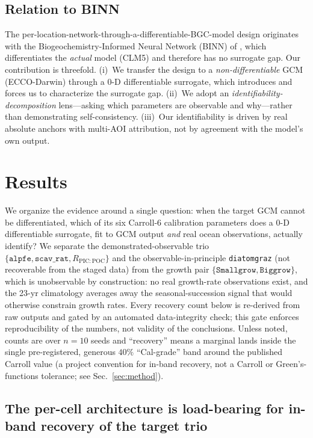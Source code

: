 \documentclass[11pt]{article}
\begin{document}
\subsection{Relation to BINN}

The per-location-network-through-a-differentiable-BGC-model design originates with the Biogeochemistry-Informed Neural Network (BINN) of \cite{xu2025binn}, which differentiates the \emph{actual} model (CLM5) and therefore has no surrogate gap. Our contribution is threefold. (i)~We transfer the design to a \emph{non-differentiable} GCM (ECCO-Darwin) through a $0$-D differentiable surrogate, which introduces and forces us to characterize the surrogate gap. (ii)~We adopt an \emph{identifiability-decomposition} lens---asking which parameters are observable and why---rather than demonstrating self-consistency. (iii)~Our identifiability is driven by real absolute anchors with multi-AOI attribution, not by agreement with the model's own output.

\section{Results}
\label{sec:results}

We organize the evidence around a single question: when the target GCM cannot be
differentiated, which of its six Carroll-6 calibration parameters does a 0-D
differentiable surrogate, fit to GCM output \emph{and} real ocean observations,
actually identify? We separate the demonstrated-observable trio
$\{\texttt{alpfe}, \texttt{scav\_rat}, R_{\mathrm{PIC:POC}}\}$ and the
observable-in-principle \texttt{diatomgraz} (not recoverable from the staged data)
from the growth pair $\{\texttt{Smallgrow}, \texttt{Biggrow}\}$, which is
unobservable by construction: no real growth-rate observations exist, and the
23-yr climatology averages away the seasonal-succession signal that would
otherwise constrain growth rates. Every recovery count below is re-derived from
raw outputs and gated by an automated data-integrity check; this gate enforces
reproducibility of the numbers, not validity of the conclusions. Unless noted,
counts are over $n{=}10$ seeds and ``recovery'' means a marginal lands inside the
single pre-registered, generous $40\%$ ``Cal-grade'' band around the published
Carroll value (a project convention for in-band recovery, not a Carroll or
Green's-functions tolerance; see Sec.~\ref{sec:method}).

\subsection{The per-cell architecture is load-bearing for in-band recovery of the target trio}
\label{sec:results-ablation}
\end{document}
